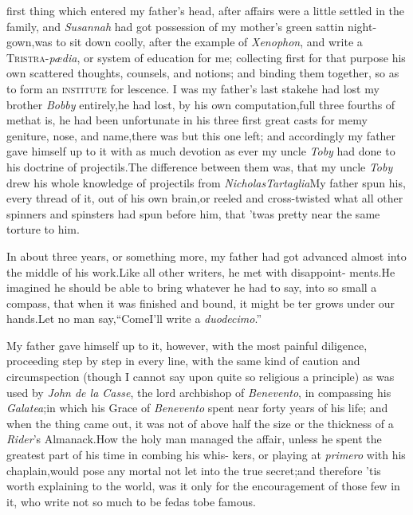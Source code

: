 \documentclass{article}
\begin{document}
\setlength{\baselineskip}{12.7826pt}%

 first thing which entered my\break
father’s head, after affairs were a\break
little settled in the family, and \textit{Susannah} had got possession of my mother’s
green sattin night-gown,\tsk was to sit down coolly, after the
example of \textit{Xenophon}, and write a
\textsc{Tristra}-\textit{pædia}, or system of education
for me; collecting first for that purpose his own scattered
thoughts, counsels, and notions; and binding them together, so as
to form an \textsc{institute} for  lescence. I was my father’s last
stake\tsk he had lost my brother \textit{Bobby} entirely,\tsk he
had lost, by his own computation,\break full three fourths of
me\tsk that is, he had been unfortunate in his three first great
casts for me\tsk my geniture, nose, and name,\tsk there was but
this one left; and accordingly my father gave himself up to it with
as much devotion as ever my uncle \textit{Toby} had done to his
doctrine of projectils.\tsk The difference between them was, that my uncle \textit{Toby} drew his whole
know\-ledge of projectils from \textit{Nicholas\break Tartaglia}\tsk My
father spun his, every thread of it, out of his own brain,\tsk or
reeled and cross-twisted what all other spinners and spinsters had
spun before him, that ’twas pretty near the same torture to
him.

\enlargethispage\baselineskip
In about three years, or something more, my father had got
advanced almost into the middle of his work.\tsk Like all other
writers, he met with disappoint- 
ments.\tsk He imagined he should be\break
able to bring whatever he had to say,\break
into so small a compass, that when it\break
was finished and bound, it might be\break
{}
ter grows under our hands.\tsk Let no man say,\tsk “Come\tsk I’ll write a \textit{duodecimo}.”

My father gave himself up to it, however, with the most painful
diligence,\break
proceeding step by step in every line, with the same
kind of caution and cir\-cumspection (though I cannot say upon quite
so religious a principle) as was used by \textit{John de la Casse},
the lord archbishop of \textit{Benevento}, in compassing his
\textit{Galatea};\break in which his Grace of \textit{Benevento} spent near
forty years of his life; and when the thing came out, it was not of
above half the size or the thickness of a \textit{Rider}’s\break
Almanack.\tsk How the holy man managed the affair, unless he
spent the great\-est part of his time in combing his whis- kers, or
playing at \textit{primero} with his chaplain,\tsk would pose any
mortal not let into the true secret;\tsk and therefore ’tis
worth explaining to the world, was it only for the encouragement of
those few in it, who write not so much to be fed\tsk as to\break be
famous.
\end{document}
